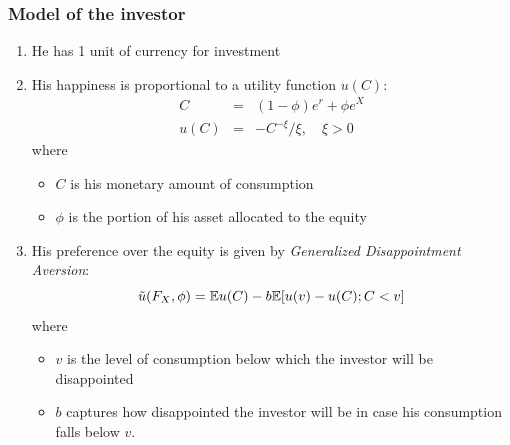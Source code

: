\documentclass{beamer}
\begin{document}
\begin{frame}
  \frametitle{Model of the investor}
  \begin{enumerate}
  \item He has 1 unit of currency for investment
  \item His happiness is proportional to a utility function $u(C)$:
    \begin{eqnarray*}
      C &=& (1 - \phi)e^r + \phi e^X \\
      u(C) &=& -C^{-\xi}/\xi, \quad \xi > 0 
    \end{eqnarray*}
    where
    \begin{itemize}
    \item $C$ is his monetary amount of consumption
    \item $\phi$ is the portion of his asset allocated to the equity
    \end{itemize}

  \item His preference over the equity is given by {\em
      Generalized Disappointment Aversion}:
    \[
    \tilde u (F_X, \phi) = \mathbb{E} u(C) - b \mathbb{E} [u(v) - u(C); C < v]
    \]
    where
    \begin{itemize}
    \item $v$ is the level of consumption below which
      the investor will be disappointed
    \item $b$ captures how disappointed the investor will be in case his consumption
      falls below $v$.
    \end{itemize}
  \end{enumerate}
\end{frame}
\end{document}
